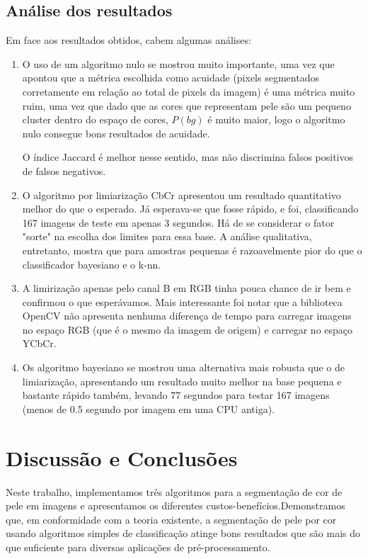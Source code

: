 \documentclass[conference]{IEEEtran}
\begin{document}
\subsection{Análise dos resultados}
Em face aos resultados obtidos, cabem algumas análises:
\begin{enumerate}
    \item O uso de um algoritmo nulo se mostrou muito importante, uma vez que apontou que a métrica escolhida como acuidade (pixels segmentados corretamente em relação ao total de pixels da imagem) é uma métrica muito ruim, uma vez que dado que as cores que representam pele são um pequeno cluster dentro do espaço de cores, \(P(bg)\) é muito maior, logo o algoritmo nulo consegue bons resultados de acuidade. 

    O índice Jaccard é melhor nesse sentido, mas não discrimina falsos positivos de falsos negativos.
    \item O algoritmo por limiarização CbCr apresentou um resultado quantitativo melhor do que o esperado. Já esperava-se que fosse rápido, e foi, classificando 167 imagens de teste em apenas 3 segundos. Há de se considerar o fator "sorte" na escolha dos limites para essa base. A análise qualitativa, entretanto, mostra que para amostras pequenas é razoavelmente pior do que o classificador bayesiano e o k-nn.
    \item A limirização apenas pelo canal B em RGB tinha pouca chance de ir bem e confirmou o que esperávamos. Mais interessante foi notar que a biblioteca OpenCV\cite{OpenCV} não apresenta nenhuma diferença de tempo para carregar imagens no espaço RGB (que é o mesmo da imagem de origem) e carregar no espaço YCbCr. 
    \item Os algoritmo bayesiano se mostrou uma alternativa mais robusta que o de limiarização, apresentando um resultado muito melhor na base pequena e bastante rápido também, levando 77 segundos para testar 167 imagens (menos de 0.5 segundo por imagem em uma CPU antiga).
\end{enumerate}


\section{Discussão e Conclusões}
Neste trabalho, implementamos três algoritmos para a segmentação de cor de pele em imagens e apresentamos os diferentes custos-benefícios.Demonstramos que, em conformidade com a teoria existente, a segmentação de pele por cor usando algoritmos simples de classificação atinge bons resultados que são mais do que suficiente para diversas aplicações de pré-processamento. 




\end{document}
